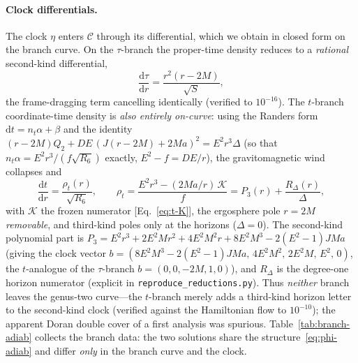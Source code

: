 \documentclass[12pt]{iopart}
\newcommand{\dd}{\mathrm{d}}
\begin{document}
\paragraph{Clock differentials.} The clock $\eta$ enters $\mathcal{C}$ through its
differential, which we obtain in closed form on the branch curve. On the
$\tau$-branch the proper-time density reduces to a \emph{rational} second-kind
differential,
\begin{equation}
    \frac{\dd\tau}{\dd r}=\frac{r^2(r-2M)}{\sqrt{S}},
    \label{eq:clock-tau}
\end{equation}
the frame-dragging term cancelling identically (verified to $10^{-16}$). The
$t$-branch coordinate-time density is \emph{also entirely on-curve}: using the
Randers form $\dd t=n_t\alpha+\beta$ and the identity
$(r-2M)Q_2+DE\,(J(r-2M)+2Ma)^2=E^2r^3\Delta$ (so that $n_t\alpha=E^2r^3/(f\sqrt{R_6})$
exactly, $E^2-f=DE/r$), the gravitomagnetic wind collapses and
\begin{equation}
    \frac{\dd t}{\dd r}=\frac{\rho_t(r)}{\sqrt{R_6}},\qquad
    \rho_t=\frac{E^2r^3-(2Ma/r)\,\mathcal K}{f}
          =P_3(r)+\frac{R_\Delta(r)}{\Delta},
    \label{eq:clock-t}
\end{equation}
with $\mathcal K$ the frozen numerator [Eq.~\eqref{eq:t-K}], the ergosphere pole
$r=2M$ \emph{removable}, and third-kind poles only at the horizons ($\Delta=0$). The
second-kind polynomial part is
$P_3=E^2r^3+2E^2Mr^2+4E^2M^2r+8E^2M^3-2(E^2-1)JMa$ (giving the clock vector
$b=(8E^2M^3-2(E^2-1)JMa,\,4E^2M^2,\,2E^2M,\,E^2,\,0)$, the $t$-analogue of the
$\tau$-branch $b=(0,0,-2M,1,0)$), and $R_\Delta$ is the degree-one horizon numerator
(explicit in \texttt{reproduce\_reductions.py}). Thus \emph{neither} branch leaves
the genus-two curve---the $t$-branch merely adds a third-kind horizon letter to the
second-kind clock (verified against the Hamiltonian flow to $10^{-10}$); the apparent
Doran double cover of a first analysis was spurious. Table~\ref{tab:branch-adiab}
collects the branch data: the two solutions share the structure~\eqref{eq:phi-adiab}
and differ \emph{only} in the branch curve and the clock.
\end{document}
